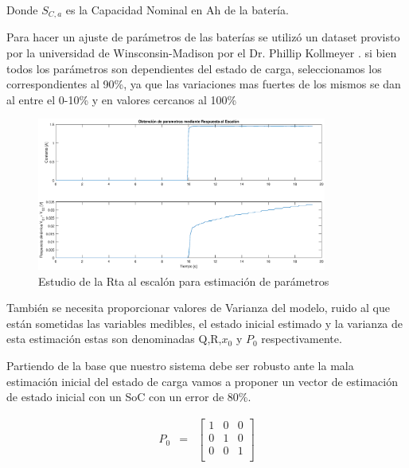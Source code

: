 \documentclass[10pt,a4paper]{article}
\begin{document}
Donde $S_{C,a}$ es la Capacidad Nominal en Ah de la batería. 

Para hacer un ajuste de parámetros de las baterías se utilizó un dataset
provisto por la universidad de Winsconsin-Madison por el Dr. Phillip Kollmeyer
\cite{Kollmeyer2018}. si bien todos los parámetros son dependientes del estado
de carga, seleccionamos los correspondientes al 90\%, ya que las variaciones mas
fuertes de los mismos se dan al entre el 0-10\% y en valores cercanos al 100\%

\begin{figure}[h!]
    \begin{center}
	\includegraphics[width=0.85\textwidth]{rta_escalon.eps}
	\caption{Estudio de la Rta al escalón para estimación de parámetros}
	\label{rta_escalon}
    \end{center}
\end{figure}
\FloatBarrier

También se necesita proporcionar valores de Varianza del modelo, ruido al que
están sometidas las variables medibles, el estado inicial estimado y la varianza
de esta estimación estas son denominadas Q,R,$x_0$ y $P_0$ respectivamente.

\noindent Partiendo de la base que nuestro sistema debe ser robusto ante la mala
estimación inicial del estado de carga vamos a proponer un vector de estimación
de estado inicial con un SoC con un error de 80\%.

\begin{equation}
    \begin{array}{llll}
	P_0 & = & \begin{bmatrix}
	    1 & 0 & 0 \\
	    0 & 1 & 0 \\
	    0 & 0 & 1 \\
	\end{bmatrix} 
    \end{array} \nonumber
\end{equation}
\end{document}
